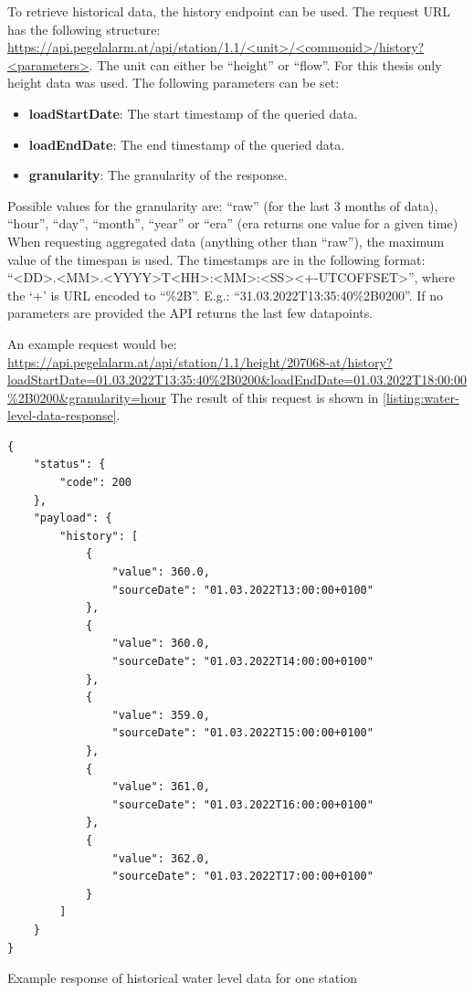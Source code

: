 To retrieve historical data, the history endpoint can be used. The request URL has the following structure: \url{https://api.pegelalarm.at/api/station/1.1/<unit>/<commonid>/history?<parameters>}. The unit can either be ``height'' or ``flow''. For this thesis only height data was used. The following parameters can be set:
\begin{itemize}
    \item \textbf{loadStartDate}: The start timestamp of the queried data.
    \item \textbf{loadEndDate}: The end timestamp of the queried data.
    \item \textbf{granularity}: The granularity of the response. 
\end{itemize}
Possible values for the granularity are: ``raw'' (for the last 3 months of data), ``hour'', ``day'', ``month'', ``year'' or ``era'' (era returns one value for a given time)
When requesting aggregated data (anything other than ``raw''), the maximum value of the timespan is used. The timestamps are in the following format: ``<DD>.<MM>.<YYYY>T<HH>:<MM>:<SS><+-UTCOFFSET>'', where the `+' is URL encoded to ``\%2B''. E.g.: ``31.03.2022T13:35:40\%2B0200''. If no parameters are provided the API returns the last few datapoints.

An example request would be: \url{https://api.pegelalarm.at/api/station/1.1/height/207068-at/history?loadStartDate=01.03.2022T13:35:40%2B0200&loadEndDate=01.03.2022T18:00:00%2B0200&granularity=hour} The result of this request is shown in \autoref{listing:water-level-data-response}.

\begin{listing}
\begin{verbatim}
{
    "status": {
        "code": 200
    },
    "payload": {
        "history": [
            {
                "value": 360.0,
                "sourceDate": "01.03.2022T13:00:00+0100"
            },
            {
                "value": 360.0,
                "sourceDate": "01.03.2022T14:00:00+0100"
            },
            {
                "value": 359.0,
                "sourceDate": "01.03.2022T15:00:00+0100"
            },
            {
                "value": 361.0,
                "sourceDate": "01.03.2022T16:00:00+0100"
            },
            {
                "value": 362.0,
                "sourceDate": "01.03.2022T17:00:00+0100"
            }
        ]
    }
}
\end{verbatim}
\caption{Example response of historical water level data for one station}
\label{listing:water-level-data-response}
\end{listing}

